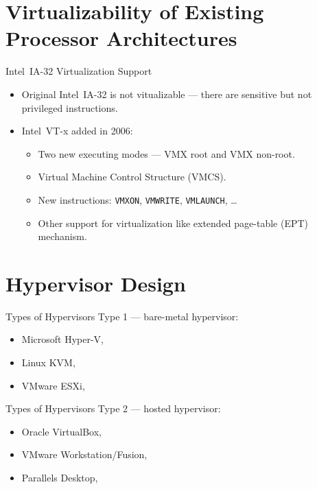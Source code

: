 \section{Virtualizability of Existing Processor Architectures}

\begin{frame}{Intel\reg~IA-32 Virtualization Support}
\begin{itemize}
\item Original Intel\reg~IA-32 is not vitualizable --- there are sensitive but
  not privileged instructions.
\item Intel\reg~VT-x added in 2006:
  \begin{itemize}
  \item Two new executing modes --- VMX root and VMX non-root.
  \item Virtual Machine Control Structure (VMCS).
  \item New instructions: \texttt{VMXON}, \texttt{VMWRITE}, \texttt{VMLAUNCH},
    \dots
  \item Other support for virtualization like extended page-table (EPT)
    mechanism.
  \end{itemize}
\end{itemize}
\end{frame}


\section{Hypervisor Design}

\begin{frame}{Types of Hypervisors}
Type 1 --- bare-metal hypervisor:
\begin{itemize}
\item Microsoft Hyper-V,
\item Linux KVM,
\item VMware ESXi,
\end{itemize}
\vfill
\centering
{}
\end{frame}

\begin{frame}{Types of Hypervisors}
Type 2 --- hosted hypervisor:
\begin{itemize}
\item Oracle VirtualBox,
\item VMware Workstation/Fusion,
\item Parallels Desktop,
\end{itemize}
\vfill
\centering
{}
\end{frame}

